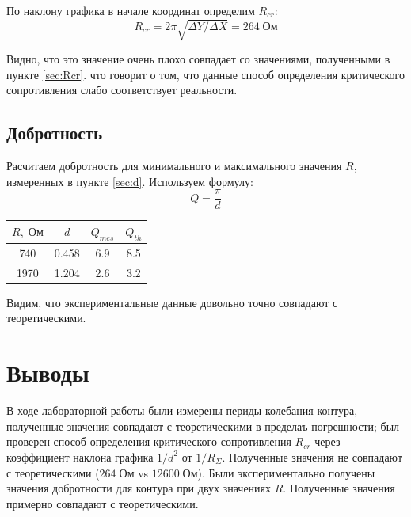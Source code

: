 \documentclass[11pt]{article}
\begin{document}
По наклону графика в начале координат определим \(R_{cr}\):
\[ R_{cr} = 2\pi\sqrt{\Delta Y / \Delta X} = 264\; Ом \]

Видно, что это значение очень плохо совпадает со значениями, полученными в пункте \ref{sec:Rcr}. что говорит о
том, что данные способ определения критического сопротивления слабо соответствует реальности.

\subsection{Добротность} \label{sec:Q}
Расчитаем добротность для минимального и максимального значения \(R\), измеренных в пункте \ref{sec:d}. Используем формулу:
\[ Q = \frac{\pi}{d} \]
\begin{table}[H]
    \centering
    \begin{tabular}{|c|c|c|c|}
        \hline
    \(R,\; Ом\) & \(d\) & \( Q_{mes} \) & \(Q_{th}\)\\\hline
    740  & 0.458 & 6.9 & 8.5 \\\hline
    1970 & 1.204 & 2.6 & 3.2 \\\hline
    \end{tabular}
\end{table}

Видим, что экспериментальные данные довольно точно совпадают с теоретическими.
\section{Выводы}

В ходе лабораторной работы были измерены периды колебания контура, полученные значения совпадают с теоретическими в пределаъ погрешности; был проверен способ определения критического сопротивления \(R_{cr}\) через коэффициент наклона графика
\(1/d^2\) от \(1/R_{\Sigma}\). Полученные значения не совпадают с теоретическими (\(264\; Ом\) vs \(12600\; Ом\)). Были экспериментально получены значения добротности для контура при двух значениях \(R\). Полученные значения примерно совпадают с теоретическими. 
\end{document}
